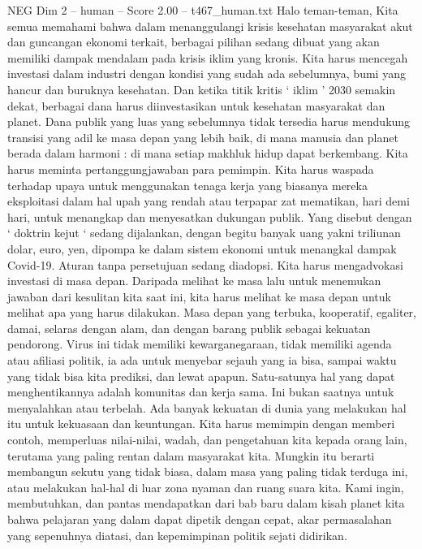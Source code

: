 \begin{textsample}{NEG Dim 2 – human – Score 2.00 – t467\_human.txt}  \label{ex:f2_neg_038}
Halo teman-teman, Kita semua memahami bahwa dalam menanggulangi krisis kesehatan masyarakat akut dan guncangan ekonomi terkait, berbagai pilihan sedang dibuat yang akan memiliki dampak mendalam pada krisis iklim yang kronis.
Kita harus mencegah investasi dalam industri dengan kondisi yang sudah ada sebelumnya, bumi yang hancur dan buruknya kesehatan.
Dan ketika titik kritis ‘ iklim ’ 2030 semakin dekat, berbagai dana harus diinvestasikan untuk kesehatan masyarakat dan planet.
Dana publik yang luas yang sebelumnya tidak tersedia harus mendukung transisi yang adil ke masa depan yang lebih baik, di mana manusia dan planet berada dalam harmoni : di mana setiap makhluk hidup dapat berkembang.
Kita harus meminta pertanggungjawaban para pemimpin.
Kita harus waspada terhadap upaya untuk menggunakan tenaga kerja yang biasanya mereka eksploitasi dalam hal upah yang rendah atau terpapar zat mematikan, hari demi hari, untuk menangkap dan menyesatkan dukungan publik.
Yang disebut dengan ‘ doktrin kejut ‘ sedang dijalankan, dengan begitu banyak uang yakni triliunan dolar, euro, yen, dipompa ke dalam sistem ekonomi untuk menangkal dampak Covid-19.
Aturan tanpa persetujuan sedang diadopsi.
Kita harus mengadvokasi investasi di masa depan.
Daripada melihat ke masa lalu untuk menemukan jawaban dari kesulitan kita saat ini, kita harus melihat ke masa depan untuk melihat apa yang harus dilakukan.
Masa depan yang terbuka, kooperatif, egaliter, damai, selaras dengan alam, dan dengan barang publik sebagai kekuatan pendorong.
Virus ini tidak memiliki kewarganegaraan, tidak memiliki agenda atau afiliasi politik, ia ada untuk menyebar sejauh yang ia bisa, sampai waktu yang tidak bisa kita prediksi, dan lewat apapun.
Satu-satunya hal yang dapat menghentikannya adalah komunitas dan kerja sama.
Ini bukan saatnya untuk menyalahkan atau terbelah.
Ada banyak kekuatan di dunia yang melakukan hal itu untuk kekuasaan dan keuntungan.
Kita harus memimpin dengan memberi contoh, memperluas nilai-nilai, wadah, dan pengetahuan kita kepada orang lain, terutama yang paling rentan dalam masyarakat kita.
Mungkin itu berarti membangun sekutu yang tidak biasa, dalam masa yang paling tidak terduga ini, atau melakukan hal-hal di luar zona nyaman dan ruang suara kita.
Kami ingin, membutuhkan, dan pantas mendapatkan dari bab baru dalam kisah planet kita bahwa pelajaran yang dalam dapat dipetik dengan cepat, akar permasalahan yang sepenuhnya diatasi, dan kepemimpinan politik sejati didirikan.

\end{textsample}
